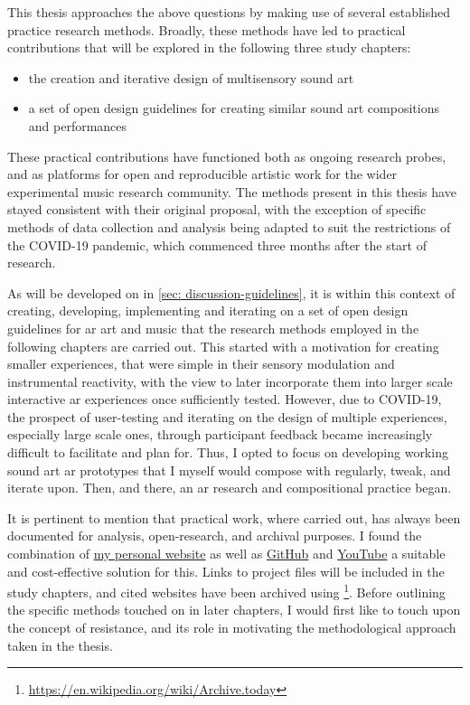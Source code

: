 This thesis approaches the above questions by making use of several established practice research methods. Broadly, these methods have led to practical contributions that will be explored in the following three study chapters: 
\begin{itemize}
    \item the creation and iterative design of multisensory sound \gls{art}
    \item a set of open design guidelines for creating similar sound \gls{art} compositions and performances
\end{itemize}
These practical contributions have functioned both as ongoing research probes, and as platforms for open and reproducible artistic work for the wider experimental music research community. The methods present in this thesis have stayed consistent with their original proposal, with the exception of specific methods of data collection and analysis being adapted to suit the restrictions of the COVID-19 pandemic, which commenced three months after the start of research. 

As will be developed on in \autoref{sec: discussion-guidelines}, it is within this context of creating, developing, implementing and iterating on a set of open design guidelines for \gls{ar} art and music that the research methods employed in the following chapters are carried out. This started with a motivation for creating smaller experiences, that were simple in their sensory modulation and instrumental reactivity, with the view to later incorporate them into larger scale interactive \gls{ar} experiences once sufficiently tested. However, due to COVID-19, the prospect of user-testing and iterating on the design of multiple experiences, especially large scale ones, through participant feedback became increasingly difficult to facilitate and plan for. Thus, I opted to focus on developing working sound art \gls{ar} prototypes that I myself would compose with regularly, tweak, and iterate upon. Then, and there, an \gls{ar} research and compositional practice began.

It is pertinent to mention that practical work, where carried out, has always been documented for analysis, open-research, and archival purposes. I found the combination of \href{https://sambilbow.github.io}{my personal website} as well as \href{https://github.com/sambilbow}{GitHub} and \href{https://youtube.com/@sambilbow}{YouTube} a suitable and cost-effective solution for this. Links to project files will be included in the study chapters, and cited websites have been archived using  \footnote{\url{https://en.wikipedia.org/wiki/Archive.today}}. Before outlining the specific methods touched on in later chapters, I would first like to touch upon the concept of resistance, and its role in motivating the methodological approach taken in the thesis.



